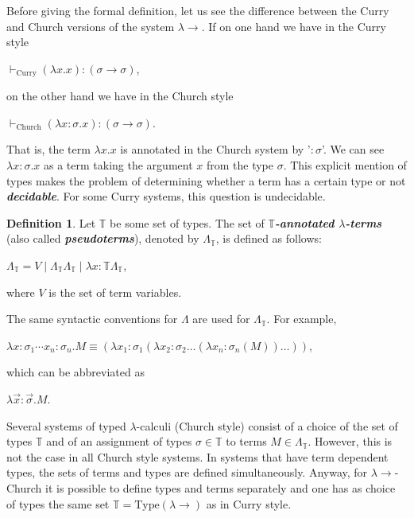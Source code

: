 \documentclass{llncs}
\newcommand{\lambdasystem}[0]{{\lambda}{\rightarrow}}
\newcommand{\myemph}[1]{\textbf{\emph{#1}}}
\theoremstyle{definition}
\newtheorem{mydef}{Definition}
\numberwithin{mydef}{subsection}
\theoremstyle{plain}
\theoremstyle{remark}
\begin{document}
	Before giving the formal definition, let us see the difference between the Curry and Church versions of the system $\lambdasystem$.
	If on one hand we have in the Curry style
	\begin{center}
		$\vdash _{\text{Curry}} \left( \lambda x . x \right) : \left( \sigma \rightarrow \sigma \right)$,
	\end{center}
	on the other hand we have in the Church style
	\begin{center}
		$\vdash _{\text{Church}} \left( \lambda x {:} \sigma . x \right) : \left( \sigma \rightarrow \sigma \right)$.
	\end{center}
	That is, the term $\lambda x . x$ is annotated in the Church system by '${:} \sigma$'.
	We can see $\lambda x {:} \sigma . x$ as a term taking the argument $x$ from the type $\sigma$.
	This explicit mention of types makes the problem of determining whether a term has a certain type or not \myemph{decidable}.
	For some Curry systems, this question is undecidable.
	
	\begin{mydef}
		Let $\mathbb{T}$ be some set of types. The set of \myemph{$\mathbb{T}$-annotated $\lambda$-terms} (also called \myemph{pseudoterms}), denoted by $\Lambda _{\mathbb{T}}$, is defined as follows:
		\begin{center}
			$\Lambda _{\mathbb{T}} = V \mid \Lambda _{\mathbb{T}} \Lambda _{\mathbb{T}} \mid \lambda x {:} \mathbb{T} \Lambda _{\mathbb{T}}$,
		\end{center}
		where $V$ is the set of term variables.
		
		The same syntactic conventions for $\Lambda$ are used for $\Lambda _{\mathbb{T}}$. For example,
		\begin{center}
			$\lambda x {:} \sigma _{1} \cdots x _{n} {:} \sigma _{n} . M \equiv \left( \lambda x _{1} {:} \sigma _{1} \left( \lambda x _{2} {:} \sigma _{2} \dots \left( \lambda x _{n} {:} \sigma _{n} \left( M \right) \right) \dots \right) \right)$,
		\end{center}
		which can be abbreviated as
		\begin{center}
			$\lambda \overrightarrow{x} {:} \overrightarrow{\sigma} . M$. \\
		\end{center}
	\end{mydef}
	
	Several systems of typed $\lambda$-calculi (Church style) consist of a choice of the set of types $\mathbb{T}$ and of an assignment of types $\sigma \in \mathbb{T}$ to terms $M \in \Lambda _{\mathbb{T}}$.
	However, this is not the case in all Church style systems.
	In systems that have term dependent types, the sets of terms and types are defined simultaneously.
	Anyway, for $\lambdasystem$-Church it is possible to define types and terms separately and one has as choice of types the same set $\mathbb{T} = \text{Type} {\left( \lambdasystem \right)}$ as in Curry style.
	
\end{document}
